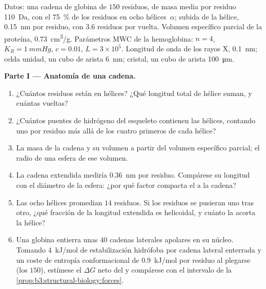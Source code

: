 \begin{problem}
\label{pb:b3:structural-biology:1}
Datos: una cadena de globina de $150$ residuos, de masa media por residuo
\qty{110}{Da}, con el \qty{75}{\%} de los residuos en ocho
hélices~$\alpha$; subida de la hélice, \qty{0.15}{nm} por residuo, con
$3.6$ residuos por vuelta. Volumen específico parcial de la proteína,
\qty{0.73}{cm^3/g}. Parámetros MWC de la hemoglobina: $n = 4$,
$K_{R} = \qty{1}{mmHg}$, $c = 0.01$, $L = 3\times 10^{5}$. Longitud de
onda de los rayos X, \qty{0.1}{nm}; celda unidad, un cubo de arista
\qty{6}{nm}; cristal, un cubo de arista \qty{100}{\micro m}.

\medskip
\noindent\textbf{Parte I --- Anatomía de una cadena.}
\begin{enumerate}
  \item ¿Cuántos residuos están en hélices? ¿Qué longitud total de
        hélice suman, y cuántas vueltas?
  \item ¿Cuántos puentes de hidrógeno del esqueleto contienen las
        hélices, contando uno por residuo más allá de los cuatro
        primeros de cada hélice?
  \item La masa de la cadena y su volumen a partir del volumen
        específico parcial; el radio de una esfera de ese volumen.
  \item La cadena extendida mediría \qty{0.36}{nm} por residuo.
        Compárese su longitud con el diámetro de la esfera: ¿por qué
        factor compacta el  a la cadena?
  \item Las ocho hélices promedian $14$ residuos. Si los residuos se
        pusieran uno tras otro, ¿qué fracción de la longitud extendida
        es helicoidal, y cuánto la acorta la hélice?
  \item Una globina entierra unas $40$ cadenas laterales apolares en su
        núcleo. Tomando \qty{4}{kJ/mol} de estabilización hidrófoba por
        cadena lateral enterrada y un coste de entropía conformacional
        de \qty{0.9}{kJ/mol} por residuo al plegarse (los $150$),
        estímese el $\Delta G$ neto del  y compárese con el
        intervalo de la \cref{prop:b3:structural-biology:forces}.
\end{enumerate}


\end{problem}
